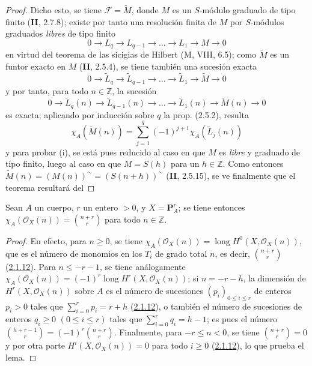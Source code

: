 \begin{proof}
Dicho esto, se tiene $\mathcal F=\widetilde M$, donde $M$ es un $S$-módulo
graduado de tipo finito (\textbf{II}, 2.7.8); existe por tanto una resolución finita
de $M$ por $S$-módulos graduados \emph{libres} de tipo finito
\[
0\to L_q\to L_{q-1}\to\ldots\to L_1\to M\to0
\]
en virtud del teorema de las sicigias de Hilbert (M, VIII, 6.5); como
$\widetilde M$ es un funtor exacto en $M$ (\textbf{II}, 2.5.4), se tiene
también una sucesión exacta
\[
0\to\widetilde L_q\to\widetilde L_{q-1}\to\ldots
\to\widetilde L_1\to\widetilde M\to0
\]
y por tanto, para todo $n\in\mathbb Z$, la sucesión
\[
0\to\widetilde L_q(n)\to\widetilde L_{q-1}(n)\to\ldots
\to\widetilde L_1(n)\to\widetilde M(n)\to0
\]
es exacta; aplicando por inducción sobre $q$ la prop. (2.5.2), resulta
\[
\chi_A(\widetilde M(n))=\sum_{j=1}^{q}(-1)^{j+1}
\chi_A(\widetilde L_j(n))
\]
y para probar (i), se está pues reducido al caso en que $M$ es \emph{libre} y graduado
de tipo finito, luego al caso en que $M=S(h)$ para un $h\in\mathbb Z$. Como
entonces $\widetilde M(n)=(M(n))^\sim=(S(n+h))^\sim$ (\textbf{II}, 2.5.15), se ve
finalmente que el teorema resultará del
\end{proof}

\begin{lemma}[2.5.3.1]
\label{III.2.5.3.1-fr}
Sean $A$ un cuerpo, $r$ un entero $>0$, y $X=\mathbf P_A^r$; se tiene
entonces
$\chi_A(\mathcal O_X(n))=\binom{n+r}{r}$
para todo $n\in\mathbb Z$.
\end{lemma}

\begin{proof}
En efecto, para $n\geq0$, se tiene
$\chi_A(\mathcal O_X(n))=\operatorname{long}H^0(X,\mathcal O_X(n))$, que
es el número de monomios en los $T_i$ de grado total $n$, es decir,
$\binom{n+r}{r}$ (\hyperref[III.2.1.12-fr]{2.1.12}). Para
$n\leq-r-1$, se tiene análogamente
$\chi_A(\mathcal O_X(n))=(-1)^r
\operatorname{long}H^r(X,\mathcal O_X(n))$;
si $n=-r-h$, la dimensión de $H^r(X,\mathcal O_X(n))$ sobre $A$ es el
número de sucesiones $(p_i)_{0\leq i\leq r}$ de enteros $p_i>0$ tales que
$\sum_{i=0}^{r}p_i=r+h$ (\hyperref[III.2.1.12-fr]{2.1.12}), o también el
número de sucesiones de enteros $q_i\geq0$ $(0\leq i\leq r)$ tales que
$\sum_{i=0}^{r}q_i=h-1$; es pues el número
$\binom{h+r-1}{r}=(-1)^r\binom{n+r}{r}$.
Finalmente, para $-r\leq n<0$, se tiene $\binom{n+r}{r}=0$ y por otra parte
$H^i(X,\mathcal O_X(n))=0$ para todo $i\geq0$
(\hyperref[III.2.1.12-fr]{2.1.12}), lo que prueba el lema.
\end{proof}

